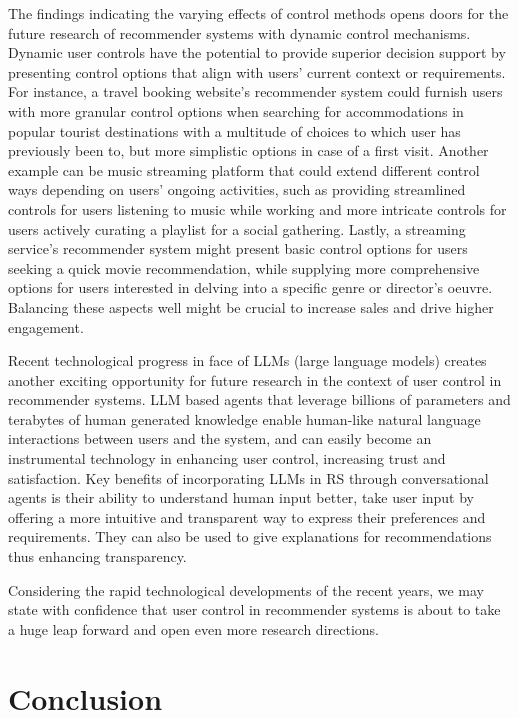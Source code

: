 \documentclass[a4paper,12pt]{article}
\begin{document}
The findings indicating the varying effects of control methods opens doors for the future research of recommender systems with dynamic control mechanisms. Dynamic user controls have the potential to provide superior decision support by presenting control options that align with users' current context or requirements. For instance, a travel booking website's recommender system could furnish users with more granular control options when searching for accommodations in popular tourist destinations with a multitude of choices to which user has previously been to, but more simplistic options in case of a first visit. Another example can be  music streaming platform that could extend different control ways depending on users' ongoing activities, such as providing streamlined controls for users listening to music while working and more intricate controls for users actively curating a playlist for a social gathering. Lastly, a streaming service's recommender system might present basic control options for users seeking a quick movie recommendation, while supplying more comprehensive options for users interested in delving into a specific genre or director's oeuvre. Balancing these aspects well might be crucial to increase sales and drive higher engagement.

Recent technological progress in face of LLMs (large language models) creates another exciting opportunity for future research in the context of user control in recommender systems. LLM based agents that leverage billions of parameters and terabytes of human generated knowledge enable human-like natural language interactions between users and the system, and can easily become an instrumental technology in enhancing user control, increasing trust and satisfaction. Key benefits of incorporating LLMs in RS through conversational agents is their ability to understand human input better, take user input by offering a more intuitive and transparent way to express their preferences and requirements. They can also be used to give explanations for recommendations thus enhancing transparency.

Considering the rapid technological developments of the recent years, we may state with confidence that user control in recommender systems is about to take a huge leap forward and open even more research directions. 



\newpage

\section{Conclusion}
\end{document}
